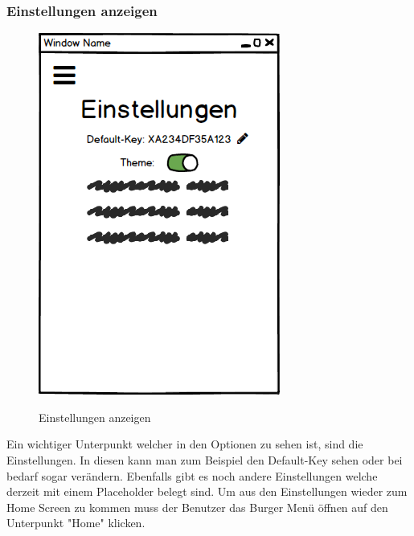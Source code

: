 \subsubsection{Einstellungen anzeigen}
\begin{figure}[H]
	\centering
	\includegraphics[width=.7\linewidth]{pictures/Desktop/Einstellungen.png}\
	\caption{Einstellungen anzeigen}
\end{figure}
Ein wichtiger Unterpunkt welcher in den Optionen zu sehen ist, sind die Einstellungen. In diesen kann man zum Beispiel den Default-Key sehen oder bei bedarf sogar verändern. Ebenfalls gibt es noch andere Einstellungen welche derzeit mit einem Placeholder belegt sind. Um aus den Einstellungen wieder zum Home Screen zu kommen muss der Benutzer das Burger Menü öffnen auf den Unterpunkt "Home" klicken.
